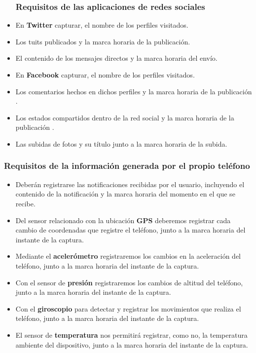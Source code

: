 \documentclass[12pt,a4paper,oneside]{book} %
\begin{document}
\begin{itemize}
\subsubsection{Requisitos de las aplicaciones de redes sociales}
  \item En \textbf{Twitter} capturar, el nombre de los perfiles visitados. 
  \item Los tuits publicados y la marca horaria de la publicación. 
  \item El contenido de los mensajes directos y la marca horaria del envío. 
  \item En \textbf{Facebook} capturar, el nombre de los perfiles visitados. 
  \item Los comentarios hechos en dichos perfiles y la marca horaria de la publicación . 
  \item Los estados compartidos dentro de la red social y la marca horaria de la publicación . 
  \item Las subidas de fotos y su título junto a la marca horaria de la subida. 
\end{itemize}
\subsubsection{Requisitos de la información generada por el propio teléfono}
\begin{itemize}
  \item Deberán registrarse las notificaciones recibidas por el usuario, incluyendo el contenido de la notificación y la marca horaria del momento en el que se recibe.
  \item Del sensor relacionado con la ubicación \textbf{GPS} deberemos registrar cada cambio de coordenadas que registre el teléfono, junto a la marca horaria del instante de la captura. 
  \item Mediante el \textbf{acelerómetro} registraremos los cambios en la aceleración del teléfono, junto a la marca horaria del instante de la captura. 
  \item Con el sensor de \textbf{presión} registraremos los cambios de altitud del teléfono, junto a la marca horaria del instante de la captura.
  \item Con el \textbf{giroscopio} para detectar y registrar  los movimientos que realiza el teléfono, junto a la marca horaria del instante de la captura.
  \item El sensor de \textbf{temperatura} nos permitirá registrar, como no, la temperatura ambiente del dispositivo, junto a la marca horaria del instante de la captura.
\end{itemize}
\end{document}
